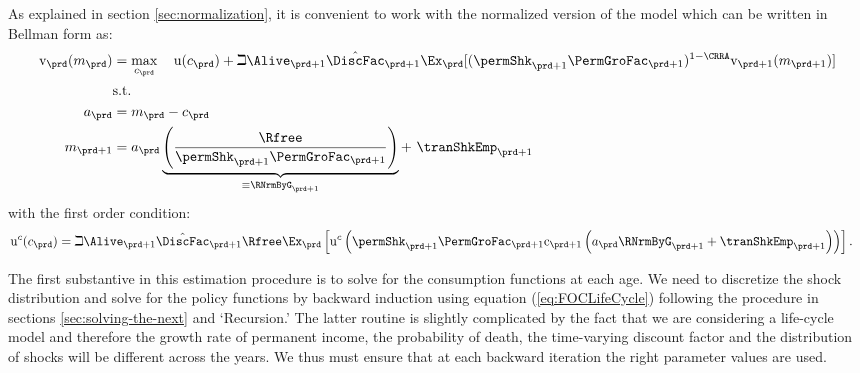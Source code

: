 \documentclass[titlepage, headings=optiontotocandhead]{econtex}
\begin{document}
As explained in section \ref{sec:normalization}, it is convenient to work with the normalized version of the model which can be written in Bellman form as:
  \begin{equation*}\begin{gathered}\begin{aligned}
        \mathrm{v}_{\prd}(m_{\prd})  & = \max_{{c}_{\prd}}~~~ \mathrm{u}(c_{\prd})+\beth\Alive_{\prd+1}\hat{\DiscFac}_{\prd+1}
        \Ex_{\prd}[(\permShk_{\prd+1}\PermGroFac_{\prd+1})^{1-\CRRA}\mathrm{v}_{\prd+1}(m_{\prd+1})]   \\
        & \text{s.t.}   \nonumber \\
        a_{\prd}    & = m_{\prd}-c_{\prd} \nonumber
        \\      m_{\prd+1}  & = a_{\prd}\underbrace{\left(\frac{\Rfree}{\permShk_{\prd+1}\PermGroFac_{\prd+1}}\right)}_{\equiv \RNrmByG_{\prd+1}}+ ~\tranShkEmp_{\prd+1}
      \end{aligned}\end{gathered}\end{equation*}
with the first order condition:
  \begin{equation}\begin{gathered}\begin{aligned}
        \mathrm{u}^{c}(c_{\prd}) & = \beth\Alive_{\prd+1}\hat{\DiscFac}_{\prd+1}\Rfree \Ex_{\prd}\left[\mathrm{u}^{c}\left(\permShk_{\prd+1}\PermGroFac_{\prd+1}\mathrm{c}_{\prd+1}\left(a_{\prd}\RNrmByG_{\prd+1}+\tranShkEmp_{\prd+1}\right)\right)\right]\label{eq:FOCLifeCycle}
        .
      \end{aligned}\end{gathered}\end{equation}

The first substantive {\move} in this estimation procedure is
to solve for the consumption functions at each age. We need to
discretize the shock distribution and solve for the policy
functions by backward induction using equation (\ref{eq:FOCLifeCycle})
following the procedure in sections \ref{sec:solving-the-next} and
`Recursion.' The latter routine
is slightly complicated by the fact that we are considering a
life-cycle model and therefore the growth rate of permanent income,
the probability of death, the time-varying discount factor and the
distribution of shocks will be different across the years. We thus
must ensure that at each backward iteration the right parameter
values are used.
\end{document}
